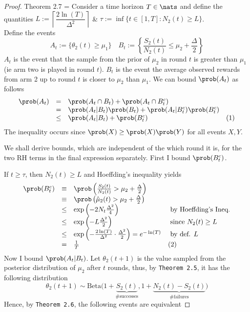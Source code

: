 \documentclass[11pt,a4paper]{article}
\begin{document}
\begin{proof}{Theorem 2.7}
  \everymath={\displaystyle}
  Consider a time horizon $T\in\nats$ and define the quantities $L:=\left\lceil\dfrac{2\ln(T)}{\Delta^2}\right\rceil$ \&  ${\tau:=\inf\{t\in[1,T]:N_2(t)\geq L\}}$.\\
  Define the events
  \[ A_t:=\{\theta_2(t)\geq\mu_1\}\quad B_t:=\left\{\frac{S_2(t)}{N_2(t)}\leq\mu_2+\frac\Delta2\right\} \]
  $A_t$ is the event that the sample from the prior of $\mu_2$ in round $t$ is greater than $\mu_1$ (ie arm two is played in round $t$). $B_t$ is the event the average observed rewards from arm 2 up to round $t$ is closer to $\mu_2$ than $\mu_1$.
  We can bound $\prob(A_t)$ as follows
  \[\begin{array}{rcll}
    \prob(A_t)&=&\prob(A_t\cap B_t)+\prob(A_t\cap B_t^c)\\
    &=&\prob(A_t|B_t)\prob(B_t)+\prob(A_t|B_t^c)\prob(B_t^c)\\
    &\leq&\prob(A_t|B_t)+\prob(B_t^c)&(1)
  \end{array}\]
  The inequality occurs since $\prob(X)\geq\prob(X)\prob(Y)$ for all events $X,Y$.
  \par We shall derive bounds, which are independent of the which round it is, for the two RH terms in the final expression separately. First I bound $\prob(B_t^c)$.
  \par If $t\geq\tau$, then $N_2(t)\geq L$ and Hoeffding's inequality yields
  \[\begin{array}{rclll}
    \prob(B_t^c)&\equiv&\prob\left(\frac{S_2(t)}{N_2(t)}>\mu_2+\frac\Delta2\right)\\
    &\equiv&\prob\left(\hat\mu_2(t)>\mu_2+\frac\Delta2\right)\\
    &\leq&\exp\left(-2N_t\frac{\Delta^2}4\right)&\text{ by Hoeffding's Ineq.}\\
    &\leq&\exp\left(-L\frac{\Delta^2}2\right)&\text{ since }N_2(t)\geq L\\
    &\leq&\exp\left(-\frac{2\ln(T)}{\Delta^2}\cdot\frac{\Delta^2}2\right)=e^{-\ln(T)}&\text{ by def. }L\\
    &=&\frac1T&(2)
  \end{array}\]
  Now I bound $\prob(A_t|B_t)$. Let $\theta_2(t+1)$ is the value sampled from the posterior distribution of $\mu_2$ after $t$ rounds, thus, by \texttt{Theorem 2.5}, it has the following distribution
  \[ \theta_2(t+1)\sim\text{Beta}\big(1+\underbrace{S_2(t)}_\text{\# successes},1+\underbrace{N_2(t)-S_2(t)}_\text{\# failures}\big) \]
  Hence, by \texttt{Theorem 2.6}, the following events are equivalent

\end{proof}
\end{document}
